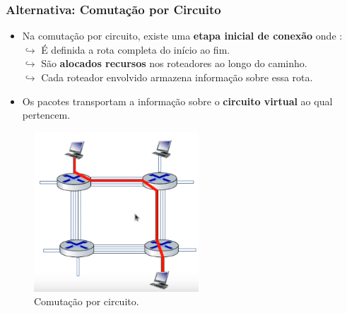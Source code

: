     \subsubsection*{Alternativa: Comutação por Circuito}
    \begin{itemize}
        \item Na comutação por circuito, existe uma \textbf{etapa inicial de conexão} onde : \\        
            $\hookrightarrow$ É definida a rota completa do início ao fim. \\
            $\hookrightarrow$ São \textbf{alocados recursos} nos roteadores ao longo do caminho. \\
            $\hookrightarrow$ Cada roteador envolvido armazena informação sobre essa rota. 
        \item Os pacotes transportam a informação sobre o \textbf{circuito virtual} ao qual pertencem.
    \end{itemize}

    \begin{figure}[H]
        \centering
        \includegraphics[width=0.55\textwidth]{img/cap-01/comutacao-circuitos.png}
        \caption{Comutação por circuito.}
    \end{figure}

